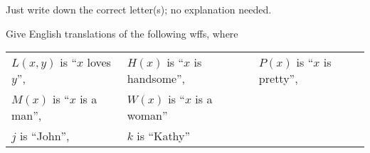 \documentclass[addpoints,12pt]{exam}
\theoremstyle{remark}
\newcommand{\meet}{\ensuremath{\wedge}}
\newcommand{\onlyif}{\ensuremath{\rightarrow}}
\begin{document}
\begin{questions}
  \medskip
  \noindent Just write down the correct letter(s); no explanation needed.
  \medskip


  \newpage

  \question[4] %

  Give English translations of the following wffs, where \\

  \begin{tabular}{lll}
    $L(x,y)$ is ``$x$ loves $y$'',& $H(x)$ is ``$x$ is handsome'',
    &$P(x)$ is ``$x$ is pretty'',\\
    $M(x)$ is ``$x$ is a man'',& $W(x)$ is ``$x$ is a woman''&\\
    $j$ is ``John'',& $k$ is ``Kathy'' &
  \end{tabular}

  \medskip

\end{questions}
\end{document}
